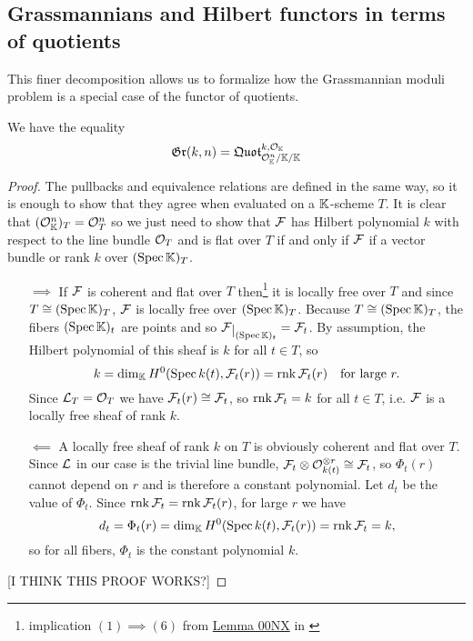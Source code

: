 \subsection{Grassmannians and Hilbert functors in terms of quotients}
This finer decomposition allows us to formalize how the Grassmannian moduli problem is a special case of the functor of quotients.
\begin{proposition}
We have the equality
\[\mathfrak{Gr}(k,n)=\mathfrak{Quot}^{k,\mathcal{O}_{\mathbb{K}}}_{\mathcal{O}_{\mathbb{K}}^n/\mathbb{K}/\mathbb{K}}\]
\end{proposition}
\begin{proof}
The pullbacks and equivalence relations are defined in the same way, so it is enough to show that they agree when evaluated on a $\mathbb{K}$-scheme $T$. It is clear that $(\mathcal{O}_{\mathbb{K}}^n)_T=\mathcal{O}_T^n$ so we just need to show that $\mathcal{F}$ has Hilbert polynomial $k$ with respect to the line bundle $\mathcal{O}_T$ and is flat over $T$ if and only if $\mathcal{F}$ if a vector bundle or rank $k$ over $(\mathrm{Spec}\, \mathbb{K})_T$. 
\setlength{\leftmargini}{0cm}
\begin{itemize}
\item[$\boxed{\implies}$] If $\mathcal{F}$ is coherent and flat over $T$ then\footnote{implication $(1)\implies (6)$ from \href{https://stacks.math.columbia.edu/tag/00NX}{Lemma 00NX} in \cite{stacks}} it is locally free over $T$ and since $T\cong(\mathrm{Spec}\,\mathbb{K})_T$, $\mathcal{F}$ is locally free over $(\mathrm{Spec}\,\mathbb{K})_T$. Because $T\cong(\mathrm{Spec}\,\mathbb{K})_T$, the fibers $(\mathrm{Spec}\,\mathbb{K})_t$ are points and so $\Fc\res{(\Spec \K)_t}=\Fc_t$. By assumption, the Hilbert polynomial of this sheaf is $k$ for all $t\in T$, so 
\[k=\dim_{\mathbb{K}} H^0(\mathrm{Spec}\, k(t),\mathcal{F}_t(r))=\mathrm{rnk}\, \mathcal{F}_t(r)\quad \text{for large }r.\]
Since $\mathcal{L}_T=\mathcal{O}_T$ we have $\mathcal{F}_t(r)\cong \mathcal{F}_t$, so $\mathrm{rnk}\, \mathcal{F}_t=k$ for all $t\in T$, i.e. $\mathcal{F}$ is a locally free sheaf of rank $k$.
\item[$\boxed{\impliedby}$] A locally free sheaf of rank $k$ on $T$ is obviously coherent and flat over $T$. Since $\mathcal{L}$ in our case is the trivial line bundle, $\mathcal{F}_t\otimes \mathcal{O}_{k(t)}^{\otimes r}\cong \mathcal{F}_t$, so $\Phi_t(r)$ cannot depend on $r$ and is therefore a constant polynomial. Let $d_t$ be the value of $\Phi_t$. Since $\mathrm{rnk}\, \mathcal{F}_t=\mathrm{rnk}\, \mathcal{F}_t(r)$, for large $r$ we have 
\[d_t=\Phi_t(r)=\dim_{\mathbb{K}} H^0(\mathrm{Spec}\, k(t), \mathcal{F}_t(r))=\mathrm{rnk}\,\mathcal{F}_t=k,\]
so for all fibers, $\Phi_t$ is the constant polynomial $k$.
\end{itemize}
\setlength{\leftmargini}{0.5cm}
[I THINK THIS PROOF WORKS?]
\end{proof}

